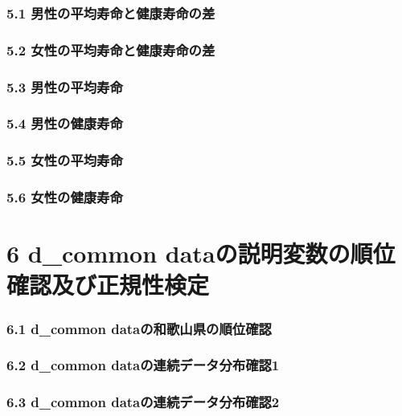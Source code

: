 \subsection{5.1 男性の平均寿命と健康寿命の差}

\subsection{5.2 女性の平均寿命と健康寿命の差}


\subsection{5.3 男性の平均寿命}


\subsection{5.4 男性の健康寿命}


\subsection{5.5 女性の平均寿命}



\subsection{5.6 女性の健康寿命}







\chapter{6 d\_common dataの説明変数の順位確認及び正規性検定}



\subsection{6.1 d\_common dataの和歌山県の順位確認}

\subsection{6.2 d\_common dataの連続データ分布確認1}

\subsection{6.3 d\_common dataの連続データ分布確認2}

